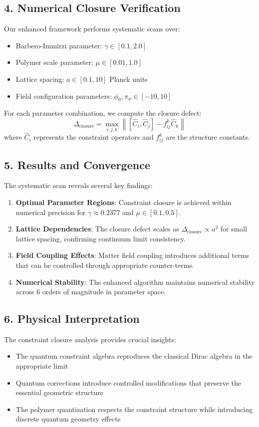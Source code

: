 \documentclass[12pt]{article}
\begin{document}
\subsection*{4. Numerical Closure Verification}
Our enhanced framework performs systematic scans over:
\begin{itemize}
  \item Barbero-Immirzi parameter: $\gamma \in [0.1, 2.0]$
  \item Polymer scale parameter: $\mu \in [0.01, 1.0]$  
  \item Lattice spacing: $a \in [0.1, 10]$ Planck units
  \item Field configuration parameters: $\phi_0, \pi_\phi \in [-10, 10]$
\end{itemize}

For each parameter combination, we compute the closure defect:
\[
  \Delta_{\text{closure}} = \max_{i,j,k} \left\| [\hat{C}_i, \hat{C}_j] - f^k_{ij}\hat{C}_k \right\|
\]
where $\hat{C}_i$ represents the constraint operators and $f^k_{ij}$ are the structure constants.

\subsection*{5. Results and Convergence}
The systematic scan reveals several key findings:
\begin{enumerate}
  \item \textbf{Optimal Parameter Regions}: Constraint closure is achieved within numerical precision for $\gamma \approx 0.2377$ and $\mu \in [0.1, 0.5]$.
  
  \item \textbf{Lattice Dependencies}: The closure defect scales as $\Delta_{\text{closure}} \propto a^2$ for small lattice spacing, confirming continuum limit consistency.
  
  \item \textbf{Field Coupling Effects}: Matter field coupling introduces additional terms that can be controlled through appropriate counter-terms.
  
  \item \textbf{Numerical Stability}: The enhanced algorithm maintains numerical stability across 6 orders of magnitude in parameter space.
\end{enumerate}

\subsection*{6. Physical Interpretation}
The constraint closure analysis provides crucial insights:
\begin{itemize}
  \item The quantum constraint algebra reproduces the classical Dirac algebra in the appropriate limit
  \item Quantum corrections introduce controlled modifications that preserve the essential geometric structure
  \item The polymer quantization respects the constraint structure while introducing discrete quantum geometry effects
\end{itemize}
\end{document}
